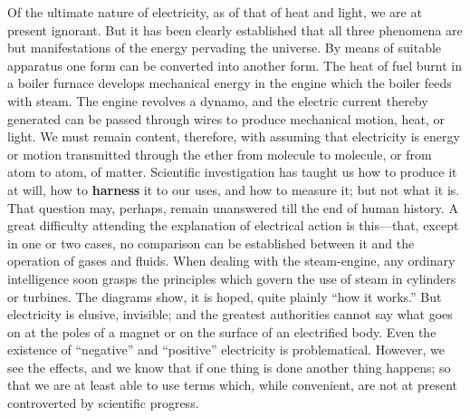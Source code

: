 \begin{linenumbers}
\modulolinenumbers[5] 
\indent Of the ultimate nature of electricity, as of that of heat and light, we are at present ignorant. But it has been clearly established that all three phenomena are but manifestations of the energy pervading the universe. By means of suitable apparatus one form can be converted into another form. The heat of fuel burnt in a boiler furnace develops mechanical energy in the engine which the boiler feeds with steam. The engine revolves a dynamo, and the electric current thereby generated can be passed through wires to produce mechanical motion, heat, or light. We must remain content, therefore, with assuming that electricity is energy or motion transmitted through the ether from molecule to molecule, or from atom to atom, of matter. Scientific investigation has taught us how to produce it at will, how to \textbf{harness} it to our uses, and how to measure it; but not what it is. That question may, perhaps, remain unanswered till the end of human history. A great difficulty attending the explanation of electrical action is this—that, except in one or two cases, no comparison can be established between it and the operation of gases and fluids. When dealing with the steam-engine, any ordinary intelligence soon grasps the principles which govern the use of steam in cylinders or turbines. The diagrams show, it is hoped, quite plainly ``how it works.'' But electricity is elusive, invisible; and the greatest authorities cannot say what goes on at the poles of a magnet or on the surface of an electrified body. Even the existence of ``negative'' and ``positive'' electricity is problematical. However, we see the effects, and we know that if one thing is done another thing happens; so that we are at least able to use terms which, while convenient, are not at present controverted by scientific progress.


\end{linenumbers}
